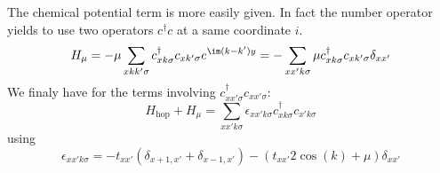 \documentclass[../main.tex]{subfile}
\begin{document}
The chemical potential term is more easily given. In fact the number operator yields to use two operators $c^{\dagger}c$ at a same coordinate $i$.
\begin{equation}
    H_{\mu} = -\mu \sum_{x kk' \sigma} c_{x k\sigma}^{\dagger} c_{x k'\sigma} e^{\im (k-k')y} = -   \sum_{xx'k\sigma} \mu c_{xk\sigma}^{\dagger} c_{xk'\sigma} \delta_{xx'}     
\end{equation}
We finaly have for the terms involving $c^{\dagger}_{xx'\sigma} c_{xx'\sigma}$:
\begin{equation*}
    H_{\text{hop}} + H_{\mu} = \sum_{xx'k\sigma} \epsilon_{xx'k\sigma} c_{xk\sigma}^{\dagger} c_{x'k\sigma}
\end{equation*}
using
\[
    \epsilon_{xx'k\sigma}= - t_{xx'} \left(\delta_{x+1, x'} + \delta_{x-1,x'}\right) - \left(t_{xx'}2\cos(k) + \mu\right) \delta_{xx'}
\]
\end{document}
